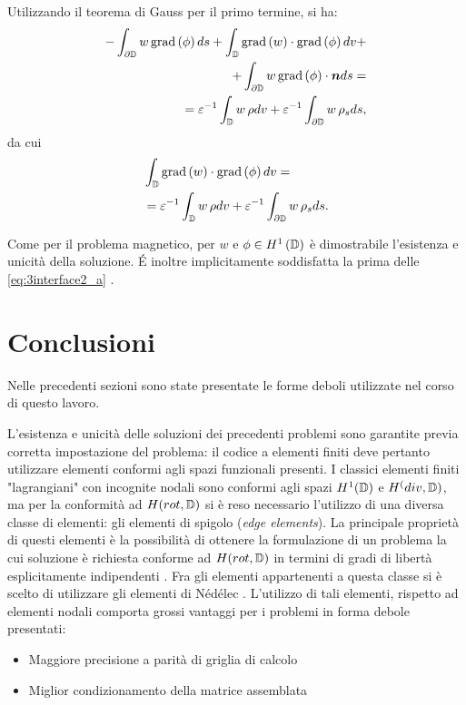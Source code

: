 Utilizzando il teorema di Gauss per il primo termine, si ha:
\begin{eqnarray}
\label{eq:3weak_e3}
-\int_{\partial\mathbb{D}}w \, \text{grad}\left(\phi\right)ds +\int_{\mathbb{D}}\text{grad}\left(w\right)\cdot \text{grad}\left(\phi\right)dv+\nonumber\\ +\int_{\partial\mathbb{D}}w \, \text{grad}\left(\phi\right)\cdot \boldsymbol{n}ds= \nonumber\\
=\varepsilon^{-1}\int_{\mathbb{D}}w\,\rho dv+\varepsilon^{-1}\int_{\partial\mathbb{D}}w\, \rho_s ds,
\end{eqnarray}
da cui
\begin{align}
\label{eq:3weak_e4}
&\int_{\mathbb{D}}\text{grad}\left(w\right)\cdot \text{grad}\left(\phi\right)dv = \nonumber\\
&=\varepsilon^{-1}\int_{\mathbb{D}}w\,\rho dv+\varepsilon^{-1}\int_{\partial\mathbb{D}}w\, \rho_s ds.
\end{align}

Come per il problema magnetico, per $w$ e $\phi \in H^1\left(\mathbb{D}\right)$ è dimostrabile l'esistenza e unicità della soluzione. \'E inoltre implicitamente soddisfatta la prima delle \eqref{eq:3interface2_a} \citep{zaglmayr_high_2006}.

\section{Conclusioni}

Nelle precedenti sezioni sono state presentate le forme deboli utilizzate nel corso di questo lavoro. 

L'esistenza e unicità delle soluzioni dei precedenti problemi sono garantite previa corretta impostazione del problema: il codice a elementi finiti deve pertanto utilizzare elementi conformi agli spazi funzionali presenti. I classici elementi finiti "lagrangiani" con  incognite nodali sono conformi agli spazi $H^1(\mathbb{D})$ e $H^(div, \mathbb{D})$, ma per la conformità ad $H(rot,\mathbb{D})$ si è reso necessario l'utilizzo di una diversa classe di elementi: gli elementi di spigolo (\textit{edge elements}). La principale proprietà di questi elementi è la possibilità di ottenere la formulazione di un problema la cui soluzione è richiesta conforme ad $H(rot,\mathbb{D})$ in termini di gradi di libertà esplicitamente indipendenti \citep{bossavit_computational_1998}. Fra gli elementi appartenenti a questa classe si è scelto di utilizzare gli elementi di Nédélec \citep{nedelec_acoustic_2001}. L'utilizzo di tali elementi, rispetto ad elementi nodali comporta grossi vantaggi per i problemi in forma debole presentati:
\begin{itemize}
\item Maggiore precisione a parità di griglia di calcolo
\item Miglior condizionamento della matrice assemblata
\end{itemize}

